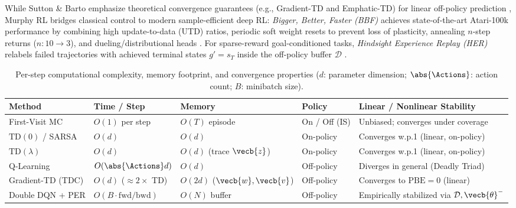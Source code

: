 \documentclass[../../../../master.tex]{subfiles}
\begin{document}
\begin{crossbook}
While Sutton \& Barto emphasize theoretical convergence guarantees (e.g., Gradient-TD and Emphatic-TD) for linear off-policy prediction , Murphy RL bridges classical control to modern sample-efficient deep RL: \emph{Bigger, Better, Faster (BBF)} achieves state-of-the-art Atari-100k performance by combining high update-to-data (UTD) ratios, periodic soft weight resets to prevent loss of plasticity, annealing $n$-step returns ($n: 10 \to 3$), and dueling/distributional heads . For sparse-reward goal-conditioned tasks, \emph{Hindsight Experience Replay (HER)} relabels failed trajectories with achieved terminal states $g' = s_T$ inside the off-policy buffer $\mathcal{D}$ .
\end{crossbook}

\begin{table}[htbp]
\centering
\caption{Per-step computational complexity, memory footprint, and convergence properties ($d$: parameter dimension; $\abs{\Actions}$: action count; $B$: minibatch size).}
\label{tab:td:complexity}
\small
\begin{tabularx}{\textwidth}{@{}l l l l X@{}}
\toprule
\textbf{Method} & \textbf{Time / Step} & \textbf{Memory} & \textbf{Policy} & \textbf{Linear / Nonlinear Stability} \\
\midrule
First-Visit MC & $O(1)$ per step & $O(T)$ episode & On / Off (IS) & Unbiased; converges under coverage \\
$\mathrm{TD}(0)$ / SARSA & $O(d)$ & $O(d)$ & On-policy & Converges w.p.1 (linear, on-policy) \\
$\mathrm{TD}(\lambda)$ & $O(d)$ & $O(d)$ (trace $\vecb{z}$) & On-policy & Converges w.p.1 (linear, on-policy) \\
Q-Learning & $O(\abs{\Actions} d)$ & $O(d)$ & Off-policy & Diverges in general (Deadly Triad) \\
Gradient-TD (TDC) & $O(d)$ ($\approx 2\times$ TD) & $O(2d)$ ($\vecb{w}, \vecb{v}$) & Off-policy & Converges to $\mathrm{PBE}=0$ (linear) \\
Double DQN + PER & $O(B \cdot \text{fwd/bwd})$ & $O(N)$ buffer & Off-policy & Empirically stabilized via $\mathcal{D}, \vecb{\theta}^-$ \\
\bottomrule
\end{tabularx}
\end{table}
\end{document}
